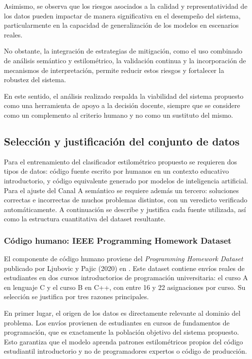 Asimismo, se observa que los riesgos asociados a la calidad y representatividad de los datos pueden impactar de manera significativa en el desempeño del sistema, particularmente en la capacidad de generalización de los modelos en escenarios reales.

No obstante, la integración de estrategias de mitigación, como el uso combinado de análisis semántico y estilométrico, la validación continua y la incorporación de mecanismos de interpretación, permite reducir estos riesgos y fortalecer la robustez del sistema.

En este sentido, el análisis realizado respalda la viabilidad del sistema propuesto como una herramienta de apoyo a la decisión docente, siempre que se considere como un complemento al criterio humano y no como un sustituto del mismo.


\subsection{Selección y justificación del conjunto de datos}

Para el entrenamiento del clasificador estilométrico propuesto se requieren dos tipos de datos: código fuente escrito por humanos en un contexto educativo introductorio, y código equivalente generado por modelos de inteligencia artificial. Para el ajuste del Canal A semántico se requiere además un tercero: soluciones correctas e incorrectas de muchos problemas distintos, con un veredicto verificado automáticamente. A continuación se describe y justifica cada fuente utilizada, así como la estructura cuantitativa del dataset resultante.

\subsubsection{Código humano: IEEE Programming Homework Dataset}

El componente de código humano proviene del \textit{Programming Homework Dataset} publicado por Ljubovic y Pajic (2020) en \cite{Ljubovic2020Dataset}. Este dataset contiene envíos reales de estudiantes en dos cursos introductorios de programación universitaria: el curso A en lenguaje C y el curso B en C++, con entre 16 y 22 asignaciones por curso. Su selección se justifica por tres razones principales.

En primer lugar, el origen de los datos es directamente relevante al dominio del problema. Los envíos provienen de estudiantes en cursos de fundamentos de programación, que es exactamente la población objetivo del sistema propuesto. Esto garantiza que el modelo aprenda patrones estilométricos propios del código estudiantil introductorio y no de programadores expertos o código de producción.

